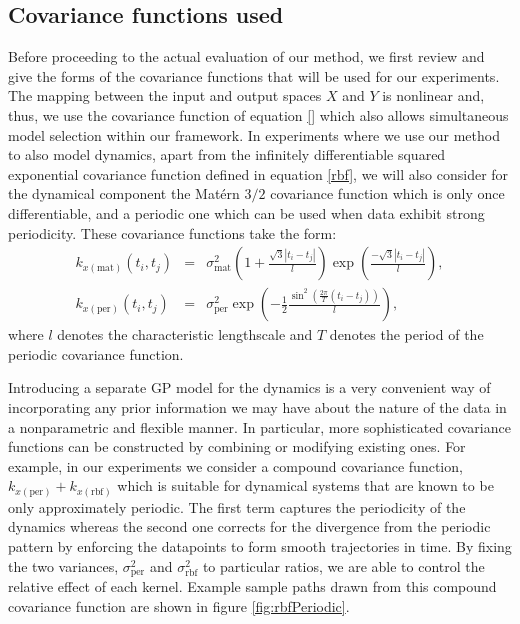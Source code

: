 \subsection{Covariance functions used \label{covarianceFunctions}}
Before proceeding to the actual evaluation of our method, we first review and give the forms
of the covariance functions that will be used for our experiments.
The mapping between the input and output spaces $X$ and $Y$ is nonlinear and, thus, we use
the covariance function of equation \eqref{} which also allows simultaneous model selection
within our framework.
In experiments where we use our method to also model dynamics,
apart from the infinitely differentiable squared exponential
covariance function defined in equation \eqref{rbf}, we will also consider for
the dynamical component the Mat\'ern $3/2$ covariance function which is only once
differentiable, and a periodic one
\citep{rasmussen-williams, MacKay98} which can be used when data
exhibit strong periodicity. These covariance functions take the form:
\begin{eqnarray}
k_{x(\text{mat})} \left( t_i, t_j \right)& = &  
\sigma_{\text{mat}}^2 \left( 1 + \frac{\sqrt{3} |t_i - t_j|}{l} \right)
		\exp \left( \frac{ - \sqrt{3} |t_i - t_j|}{l} \right), \nonumber \\
k_{x(\text{per})} \left( \mathit{t_i, t_j} \right) 
& = & 
	\sigma_{\text{per}}^2 \exp \left( -\frac{1}{2} \frac{\sin^2 \left( \frac{2
                \pi}{T} \left( t_i - t_j \right) \right) }{l} \right),
 \label{eq:temporalkernels}
\end{eqnarray}
%
where $l$ denotes the characteristic lengthscale and $T$ denotes the period of the periodic covariance function.
%
\par Introducing a separate GP model for the dynamics is a very convenient way of incorporating any prior information
we may have about the nature of the data in a nonparametric and flexible manner. 
In particular, more sophisticated covariance functions can be constructed
by combining or modifying existing ones. For example, in our experiments we consider a compound covariance function,
$k_{x(\text{per})} + k_{x(\text{rbf})}$
which is suitable for dynamical systems that are known to be only approximately periodic. 
The first term
captures the periodicity of the dynamics whereas the second one corrects for the divergence
from the periodic pattern by enforcing the datapoints to form smooth trajectories in time.
By fixing the two variances, $\sigma_{\text{per}}^2$ and $\sigma_{\text{rbf}}^2$ to particular ratios, we are able
to control the relative effect of each kernel. Example sample paths drawn from this compound covariance function are
shown in figure \ref{fig:rbfPeriodic}.


